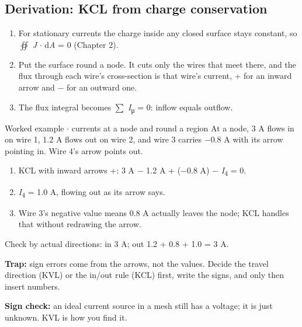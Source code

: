 \documentclass[11pt]{article}
\begin{document}
\begin{keepsection}
\begin{keepsection}
\subsection{Derivation: KCL from charge conservation}

\begin{enumerate}
\item For stationary currents the charge inside any closed surface stays constant, so $\oiint $ \textit{J} \ensuremath{\cdot} d\textit{A} = 0 (Chapter 2).
\item Put the surface round a node. It cuts only the wires that meet there, and the flux through each wire’s cross-section is that wire’s current, + for an inward arrow and \ensuremath{-} for an outward one.
\item The flux integral becomes \ensuremath{\textstyle\sum} \textit{I}\textsubscript{μ} = 0: inflow equals outflow.
\end{enumerate}

\begin{workedbox}{Worked example \ensuremath{\cdot} currents at a node and round a region}
At a node, 3 A flows in on wire 1, 1.2 A flows out on wire 2, and wire 3 carries \ensuremath{-}0.8 A with its arrow pointing in. Wire 4’s arrow points out.

\begin{enumerate}
\item KCL with inward arrows +: 3 A \ensuremath{-} 1.2 A + (\ensuremath{-}0.8 A) \ensuremath{-} \textit{I}\textsubscript{4} = 0.
\item \textit{I}\textsubscript{4} = 1.0 A, flowing out as its arrow says.
\item Wire 3’s negative value means 0.8 A actually leaves the node; KCL handles that without redrawing the arrow.
\end{enumerate}

Check by actual directions: in 3 A; out 1.2 + 0.8 + 1.0 = 3 A.
\end{workedbox}

\begin{notebox}\textbf{Trap:} sign errors come from the arrows, not the values. Decide the travel direction (KVL) or the in/out rule (KCL) first, write the signs, and only then insert numbers.\end{notebox}

\begin{notebox}\textbf{Sign check:} an ideal current source in a mesh still has a voltage; it is just unknown. KVL is how you find it.\end{notebox}


\end{keepsection}
\end{keepsection}
\end{document}
